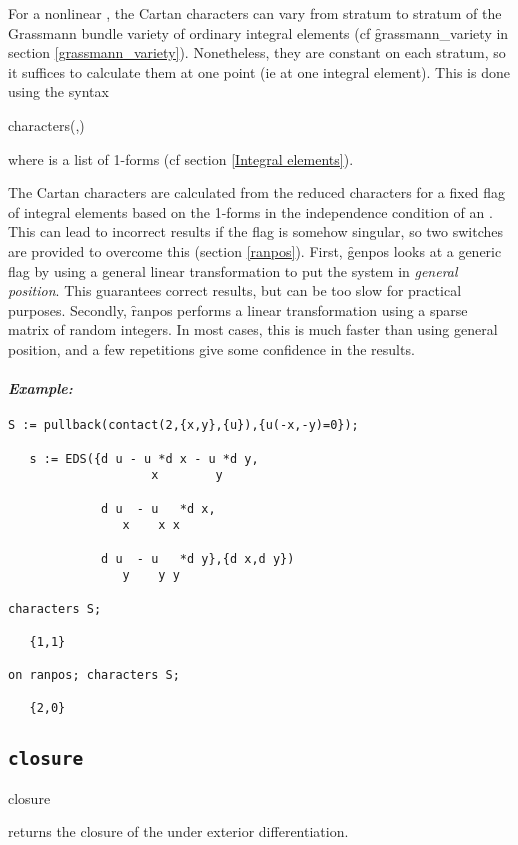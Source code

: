 For a nonlinear , the Cartan characters can vary from stratum to
stratum of the Grassmann bundle variety of ordinary integral elements (cf
\f{grassmann\_variety} in section \ref{grassmann_variety}). Nonetheless,
they are constant on each stratum, so it suffices to calculate them at one
point (ie at one integral element). This is done using the syntax
\begin{syntax}
	characters(,)
\end{syntax}
where  is a list of 1-forms (cf section
\ref{Integral elements}).

The Cartan characters are calculated from the reduced characters for a
fixed flag of integral elements based on the 1-forms in the independence
condition of an . This can lead to incorrect results if the flag
is somehow singular, so two switches are provided to overcome this (section
\ref{ranpos}). First, \f{genpos} looks at a generic flag by using a general
linear transformation to put the system in {\em general position}. This
guarantees correct results, but can be too slow for practical
purposes. Secondly, \f{ranpos} performs a linear transformation using a
sparse matrix of random integers. In most cases, this is much faster than
using general position, and a few repetitions give some confidence in the
results.

\paragraph{\it Example:}
\begin{verbatim}
S := pullback(contact(2,{x,y},{u}),{u(-x,-y)=0});

   s := EDS({d u - u *d x - u *d y,
                    x        y 

             d u  - u   *d x,
                x    x x 

             d u  - u   *d y},{d x,d y})
                y    y y

characters S;

   {1,1} 

on ranpos; characters S;

   {2,0}
\end{verbatim}

\subsection{\tt closure}
\label{closure}

\begin{syntax}
	closure 
\end{syntax}
returns the closure of the  under exterior differentiation. 


